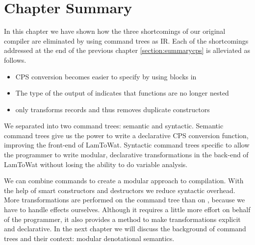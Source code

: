 
\section{\label{section:summarytree}Chapter Summary}
In this chapter we have shown how the three shortcomings of our original compiler are eliminated by using command trees as IR. Each of the shortcomings addressed at the end of the previous chapter \ref{section:summarycps} is alleviated as follows. 

\begin{itemize}
\item CPS conversion becomes easier to specify by using blocks in 
\item The type of the output of  indicates that functions are no longer nested
\item {} only transforms records and thus removes duplicate constructors
\end{itemize}

We separated  into two command trees: semantic and syntactic. Semantic command trees give us the power to write a declarative CPS conversion function, improving the front-end of LamToWat. Syntactic command trees specific to  allow the programmer to write modular, declarative transformations in the back-end of LamToWat without losing the ability to do variable analysis.

We can combine commands to create a modular approach to compilation. With the help of smart constructors and destructors we reduce syntactic overhead. More transformations are performed on the command tree than on , because we have to handle effects ourselves. Although it requires a little more effort on behalf of the programmer, it also provides a method to make transformations explicit and declarative. In the next chapter we will discuss the background of command trees and their context: modular denotational semantics.
